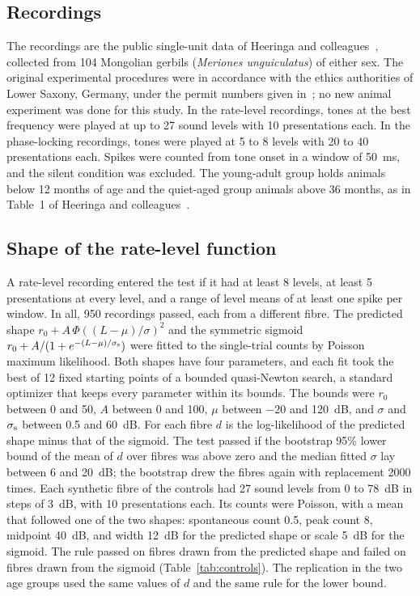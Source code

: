 \documentclass[10pt,letterpaper]{article}
\begin{document}
\subsection{Recordings}
The recordings are the public single-unit data of Heeringa and colleagues~\cite{Heeringa2024}, collected from 104 Mongolian gerbils
(\emph{Meriones unguiculatus}) of either sex. The original experimental procedures were in accordance with the ethics authorities of
Lower Saxony, Germany, under the permit numbers given in~\cite{Heeringa2024}; no new animal experiment was done for this study. In
the rate-level recordings, tones at the best frequency were played at up to 27 sound levels with 10 presentations each. In the
phase-locking recordings, tones were played at 5 to 8 levels with 20 to 40 presentations each. Spikes were counted from tone onset in
a window of 50~ms, and the silent condition was excluded. The young-adult group holds animals below 12 months of age and the
quiet-aged group animals above 36 months, as in Table~1 of Heeringa and colleagues~\cite{Heeringa2024}.

\subsection{Shape of the rate-level function}
A rate-level recording entered the test if it had at least 8 levels, at least 5 presentations at every level, and a range of level
means of at least one spike per window. In all, 950 recordings passed, each from a different fibre. The predicted shape $r_0+A\,\Phi((L-\mu)/\sigma)^2$ and the symmetric
sigmoid $r_0+A/(1+e^{-(L-\mu)/\sigma_{\rm s}})$ were fitted to the single-trial counts by Poisson maximum likelihood. Both shapes have four parameters, and each fit took the best of 12 fixed
starting points of a bounded quasi-Newton search, a standard optimizer that keeps every parameter within its bounds. The bounds were $r_0$ between 0 and 50, $A$ between 0 and 100, $\mu$ between $-20$
and 120~dB, and $\sigma$ and $\sigma_{\rm s}$ between 0.5 and 60~dB. For each fibre $d$ is the log-likelihood of the predicted shape minus that of the sigmoid.
The test passed if the bootstrap 95\% lower bound of the mean of $d$ over fibres was above zero and the median fitted $\sigma$ lay
between 6 and 20~dB; the bootstrap drew the fibres again with replacement 2000 times. Each synthetic fibre of the controls had 27
sound levels from 0 to 78~dB in steps of 3~dB, with 10 presentations each. Its counts were Poisson, with a mean that followed one of
the two shapes: spontaneous count 0.5, peak count 8, midpoint 40~dB, and width 12~dB for the predicted shape or scale 5~dB for the
sigmoid. The rule
passed on fibres drawn from the predicted shape and failed on fibres drawn from the sigmoid (Table~\ref{tab:controls}). The replication in the two age
groups used the same values of $d$ and the same rule for the lower bound.
\end{document}
